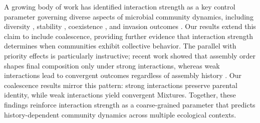 

A growing body of work has identified interaction strength as a key control parameter governing diverse aspects of microbial community dynamics, including diversity \citep{Hu2022, Marsland2019}, stability \citep{Allesina2012, Ratzke2020}, coexistence \citep{Grilli2017}, and invasion outcomes \citep{Hu2025, Kurkjian2021}. Our results extend this claim to include coalescence, providing further evidence that interaction strength determines when communities exhibit collective behavior. The parallel with priority effects is particularly instructive; recent work showed that assembly order shapes final composition only under strong interactions, whereas weak interactions lead to convergent outcomes regardless of assembly history \citep{Hu2025, Fukami2015}. Our coalescence results mirror this pattern: strong interactions preserve parental identity, while weak interactions yield convergent Mixtures. Together, these findings reinforce interaction strength as a coarse-grained parameter that predicts history-dependent community dynamics across multiple ecological contexts. 

